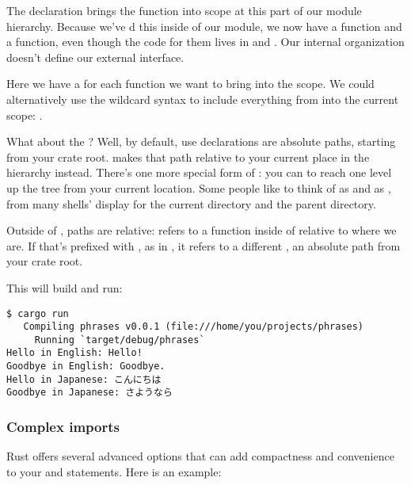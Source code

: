 The  declaration brings the function into scope at this part of our module hierarchy. Because we've d this 
inside of our  module, we now have a  function and a 
function, even though the code for them lives in  and .
Our internal organization doesn't define our external interface.

\blank

Here we have a  for each function we want to bring into the  scope. We could alternatively use the wildcard 
syntax to include everything from  into the current scope: .

\blank

What about the ? Well, by default, use declarations are absolute paths, starting from your crate root.  makes that 
path relative to your current place in the hierarchy instead. There's one more special form of : you can  to 
reach one level up the tree from your current location. Some people like to think of  as  and  as , 
from many shells' display for the current directory and the parent directory.

\blank

Outside of , paths are relative:  refers to a function inside of  relative to where we are. If 
that's prefixed with \code{::}, as in , it refers to a different , an absolute path from your crate root.

\blank

This will build and run:

\begin{verbatim}
$ cargo run
   Compiling phrases v0.0.1 (file:///home/you/projects/phrases)
     Running `target/debug/phrases`
Hello in English: Hello!
Goodbye in English: Goodbye.
Hello in Japanese: こんにちは
Goodbye in Japanese: さようなら
\end{verbatim}

\subsubsection*{Complex imports}

Rust offers several advanced options that can add compactness and convenience to your  and  statements. 
Here is an example:

